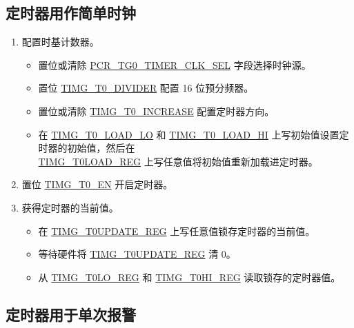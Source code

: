 \documentclass[main\_\_CN.tex]{subfiles}
\begin{document}
\subsection{定时器用作简单时钟}\label{sec:timg-func-descr-simple-clock}

\begin{enumerate}
    \item 配置时基计数器。
        \begin{itemize}
        \item 置位或清除 \hyperref[fielddesc:PCRTG0TIMERCLKSEL]{PCR\_TG0\_TIMER\_CLK\_SEL} 字段选择时钟源。
        \item 置位 \hyperref[fielddesc:TIMGTXDIVIDER]{TIMG\_T0\_DIVIDER} 配置 16 位预分频器。
        \item 置位或清除 \hyperref[fielddesc:TIMGTXINCREASE]{TIMG\_T0\_INCREASE} 配置定时器方向。
        \item 在 \hyperref[fielddesc:TIMGTXLOADLO]{TIMG\_T0\_LOAD\_LO} 和 \hyperref[fielddesc:TIMGTXLOADHI]{TIMG\_T0\_LOAD\_HI} 上写初始值设置定时器的初始值，然后在 \\\hyperref[regdesc:TIMGTXLOADREG]{TIMG\_T0LOAD\_REG} 上写任意值将初始值重新加载进定时器。
    \end{itemize}
    \item 置位 \hyperref[fielddesc:TIMGTXEN]{TIMG\_T0\_EN} 开启定时器。
    \item 获得定时器的当前值。
    \begin{itemize}
        \item 在 \hyperref[regdesc:TIMGTXUPDATEREG]{TIMG\_T0UPDATE\_REG} 上写任意值锁存定时器的当前值。
        \item 等待硬件将 \hyperref[regdesc:TIMGTXUPDATEREG]{TIMG\_T0UPDATE\_REG} 清 0。
        \item 从 \hyperref[regdesc:TIMGTXLOREG]{TIMG\_T0LO\_REG} 和 \hyperref[regdesc:TIMGTXHIREG]{TIMG\_T0HI\_REG} 读取锁存的定时器值。
    \end{itemize}
\end{enumerate}

\subsection{定时器用于单次报警}\label{sec:timg-func-descr-timer-alarm}
\end{document}
